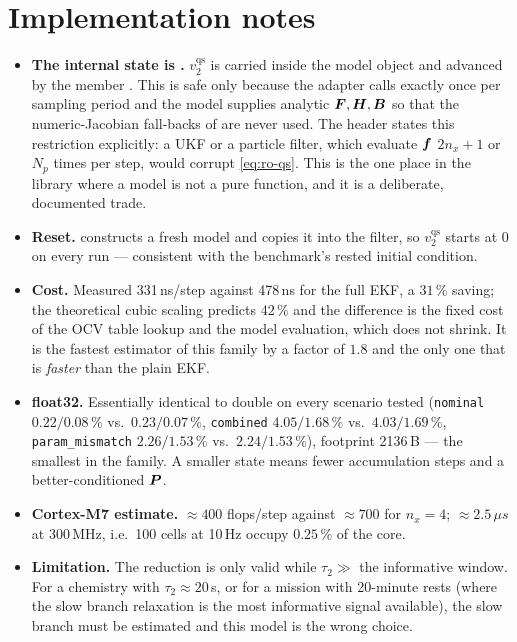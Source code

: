 \section{Implementation notes}
\begin{itemize}[nosep]
\item \textbf{The internal state is .}  $v^{\mathrm{qs}}_2$ is carried inside the
model object and advanced by the  member .  This is safe only because the
adapter calls  exactly once per sampling period and the model supplies analytic
$\bm{F},\bm{H},\bm{B}$ so that the numeric-Jacobian fall-backs of  are never used.  The
header states this restriction explicitly: a UKF or a particle filter, which evaluate $\bm{f}$
$2n_x+1$ or $N_p$ times per step, would corrupt \eqref{eq:ro-qs}.  This is the one place in the
library where a model is not a pure function, and it is a deliberate, documented trade.
\item \textbf{Reset.}   constructs a fresh model and copies it into the
filter, so $v^{\mathrm{qs}}_2$ starts at 0 on every run --- consistent with the benchmark's
rested initial condition.
\item \textbf{Cost.}  Measured 331\,ns/step against 478\,ns for the full EKF, a $31\,\%$ saving;
the theoretical cubic scaling predicts $42\,\%$ and the difference is the fixed cost of the OCV
table lookup and the model evaluation, which does not shrink.  It is the fastest estimator of this
family by a factor of $1.8$ and the only one that is \emph{faster} than the plain EKF.
\item \textbf{float32.}  Essentially identical to double on every scenario tested
(\texttt{nominal} $0.22/0.08\,\%$ vs.\ $0.23/0.07\,\%$, \texttt{combined} $4.05/1.68\,\%$ vs.\
$4.03/1.69\,\%$, \texttt{param\_mismatch} $2.26/1.53\,\%$ vs.\ $2.24/1.53\,\%$), footprint 2136\,B
--- the smallest in the family.  A smaller state means fewer accumulation steps and a
better-conditioned $\bm{P}$.
\item \textbf{Cortex-M7 estimate.}  $\approx400$ flops/step against $\approx700$ for $n_x=4$;
$\approx2.5\,\ensuremath{\mu}s$ at 300\,MHz, i.e.\ 100 cells at 10\,Hz occupy $0.25\,\%$ of the core.
\item \textbf{Limitation.}  The reduction is only valid while $\tau_2\gg$ the informative window.
For a chemistry with $\tau_2\approx20$\,s, or for a mission with 20-minute rests (where the slow
branch relaxation is the most informative signal available), the slow branch must be estimated and
this model is the wrong choice.
\end{itemize}

